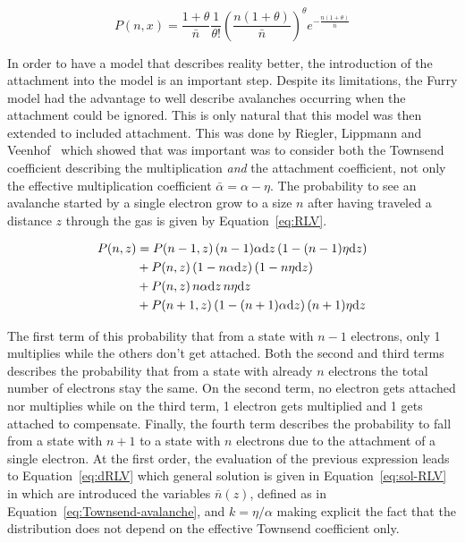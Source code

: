 	\begin{equation}
	\label{eq:Polya-P}
	P(n,x) = \frac{1+\theta}{\bar{n}}\frac{1}{\theta !} \left( \frac{n(1+\theta)}{\bar{n}} \right)^\theta e^{-\frac{n(1+\theta)}{\bar{n}}}
	\end{equation}
	
	In order to have a model that describes reality better, the introduction of the attachment into the model is an important step. Despite its limitations, the Furry model had the advantage to well describe avalanches occurring when the attachment could be ignored. This is only natural that this model was then extended to included attachment. This was done by Riegler, Lippmann and Veenhof~\cite{RIEGLER2003} which showed that was important was to consider both the Townsend coefficient describing the multiplication \textit{and} the attachment coefficient, not only the effective multiplication coefficient $\bar{\alpha} = \alpha - \eta$. The probability to see an avalanche started by a single electron grow to a size $n$ after having traveled a distance $z$ through the gas is given by Equation~\ref{eq:RLV}.
	
	\begin{equation}
	\label{eq:RLV}
		\begin{aligned}
		P(n,z) &= P(n-1,z) \, (n-1)\alpha\mathrm{d}{z} \, (1-(n-1)\eta\mathrm{d}{z})\\
			   &+ P(n,z)   \, (1-n\alpha\mathrm{d}{z}) \, (1-n\eta\mathrm{d}{z})\\
			   &+ P(n,z)   \, n\alpha\mathrm{d}{z} \, n\eta\mathrm{d}{z}\\
			   &+ P(n+1,z) \, (1-(n+1)\alpha\mathrm{d}{z}) \, (n+1)\eta\mathrm{d}{z}
		\end{aligned}
	\end{equation}
	
	The first term of this probability that from a state with $n-1$ electrons, only 1 multiplies while the others don't get attached. Both the second and third terms describes the probability that from a state with already $n$ electrons the total number of electrons stay the same. On the second term, no electron gets attached nor multiplies while on the third term, 1 electron gets multiplied and 1 gets attached to compensate. Finally, the fourth term describes the probability to fall from a state with $n+1$ to a state with $n$ electrons due to the attachment of a single electron. At the first order, the evaluation of the previous expression leads to Equation~\ref{eq:dRLV} which general solution is given in Equation~\ref{eq:sol-RLV} in which are introduced the variables $\bar{n}(z)$, defined as in Equation~\ref{eq:Townsend-avalanche}, and $k = \eta/\alpha$ making explicit the fact that the distribution does not depend on the effective Townsend coefficient only.
	
